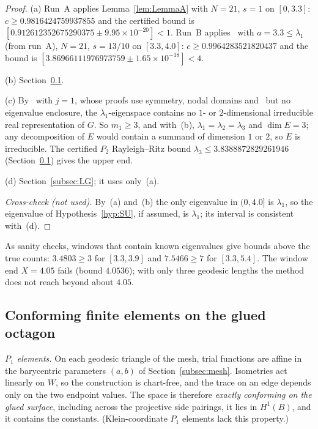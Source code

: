 \documentclass[11pt]{amsart}
\theoremstyle{definition}
\theoremstyle{remark}
\begin{document}
\begin{proof}
(a) Run~A applies Lemma~\ref{lem:LemmaA} with $N=21$, $s=1$ on $[0,3.3]$: $c\ge0.9816424759937855$
and the certified bound is $[0.912612352675290375\pm9.95\times10^{-20}]<1$. Run~B
applies~\cite[Lemma~3.2]{FBP-K} with $a=3.3\le\lambda_1$ (from run~A), $N=21$, $s=13/10$ on
$[3.3,4.0]$: $c\ge0.9964283521820437$ and the bound is
$[3.86966111976973759\pm1.65\times10^{-18}]<4$.

(b) Section~\ref{subsec:FE}.

(c) By~\cite[Lemmas~7.2--7.3]{FBP-K} with $j=1$, whose proofs use symmetry, nodal domains
and~\cite[Prop.~4.4]{FBP-K} but no eigenvalue enclosure, the $\lambda_1$-eigenspace contains no
$1$- or $2$-dimensional irreducible real representation of $G$. So $m_1\ge3$, and with~(b),
$\lambda_1=\lambda_2=\lambda_3$ and $\dim E=3$; any decomposition of $E$ would contain a summand of
dimension $1$ or $2$, so $E$ is irreducible. The certified $P_2$
Rayleigh--Ritz bound $\lambda_3\le3.8388872829261946$ (Section~\ref{subsec:FE}) gives the upper end.

(d) Section~\ref{subsec:LG}; it uses only~(a).

\emph{Cross-check (not used).} By~(a) and~(b) the only eigenvalue in $(0,4.0]$ is $\lambda_1$, so the
eigenvalue of Hypothesis~\ref{hyp:SU}, if assumed, is $\lambda_1$; its interval is consistent with~(d).
\end{proof}

As sanity checks, windows that contain known eigenvalues give bounds above the true counts:
$3.4803\ge3$ for $[3.3,3.9]$ and $7.5466\ge7$ for $[3.3,5.4]$. The window end $X=4.05$ fails
(bound $4.0536$); with only three geodesic lengths the method does not reach beyond about $4.05$.

\subsection{Conforming finite elements on the glued octagon}\label{subsec:FE}

\emph{$P_1$ elements.} On each geodesic triangle of the mesh, trial functions are affine in the
barycentric parameters $(a,b)$ of Section~\ref{subsec:mesh}. Isometries act linearly on $W$, so the
construction is chart-free, and the trace on an edge depends only on the two endpoint values. The
space is therefore \emph{exactly conforming on the glued surface}, including across the projective
side pairings, it lies in $H^1(B)$, and it contains the constants. (Klein-coordinate $P_1$ elements
lack this property.)
\end{document}
